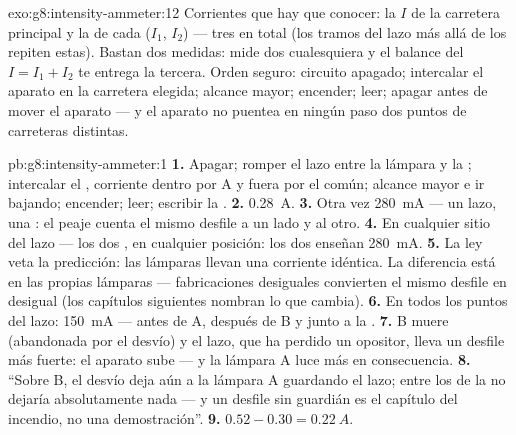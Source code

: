 \begin{solution}{exo:g8:intensity-ammeter:12}
Corrientes que hay que conocer: la $I$ de la carretera principal y la
de cada  ($I_1$, $I_2$) --- tres en total (los tramos del lazo
más allá de los  repiten estas). Bastan dos medidas:
mide dos cualesquiera y el balance del  $I = I_1 +
I_2$ te entrega la tercera. Orden seguro: circuito apagado; intercalar
el aparato en la carretera elegida; alcance mayor; encender; leer;
apagar antes de mover el aparato --- y el aparato no puentea en ningún
paso dos puntos de carreteras distintas.
\end{solution}

\begin{solution}{pb:g8:intensity-ammeter:1}
\textbf{1.} Apagar; romper el lazo entre la lámpara y la
; intercalar el , corriente dentro por
\unit{A} y fuera por el común; alcance mayor e ir bajando; encender;
leer; escribir la .
\textbf{2.} \qty{0.28}{A}.
\textbf{3.} Otra vez \qty{280}{mA} --- un lazo, una
: el peaje cuenta el mismo desfile a un lado y al
otro.
\textbf{4.} En cualquier sitio del lazo --- los dos , en
cualquier posición: los dos enseñan \qty{280}{mA}.
\textbf{5.} La ley veta la predicción: las lámparas  llevan
una corriente idéntica. La diferencia está en las propias lámparas ---
fabricaciones desiguales convierten el mismo desfile en 
desigual (los capítulos siguientes nombran lo que cambia).
\textbf{6.} En todos los puntos del lazo: \qty{150}{mA} --- antes de
A, después de B y junto a la .
\textbf{7.} B muere (abandonada por el desvío) y el lazo, que ha
perdido un opositor, lleva un desfile más fuerte: el aparato sube ---
y la lámpara A luce más en consecuencia.
\textbf{8.} ``Sobre B, el desvío deja aún a la lámpara A guardando el
lazo; entre los  de la  no dejaría absolutamente nada
--- y un desfile sin guardián es el capítulo del incendio, no una
demostración''.
\textbf{9.} $0.52 - 0.30 = \qty{0.22}{A}$.

\end{solution}
